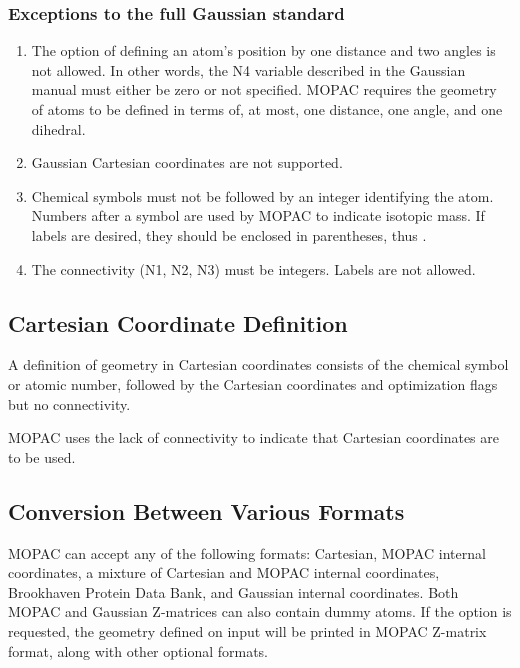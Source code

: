 \subsubsection{Exceptions to the full Gaussian standard}
\begin{enumerate}
\item  The option of defining an atom's position by  one  distance  and
       two  angles  is  not  allowed.   In other words, the N4 variable
       described in the Gaussian manual must  either  be  zero  or  not
       specified.   MOPAC  requires the geometry of atoms to be defined
       in terms of, at most, one distance, one angle, and one dihedral.

\item  Gaussian Cartesian coordinates are not supported.

\item Chemical symbols must not be followed by an integer  identifying
 the  atom.  Numbers after a symbol are used by MOPAC to indicate
 isotopic mass.  If labels are desired, they should  be  enclosed
 in parentheses, thus .

\item The connectivity (N1, N2, N3) must be integers.  Labels are  not
          allowed.
\end{enumerate}

\subsection{Cartesian Coordinate Definition}
 A definition of geometry in Cartesian coordinates  consists  of  the
   chemical  symbol  or atomic number, followed by the Cartesian coordinates
   and optimization flags but no connectivity.

   MOPAC uses the lack  of  connectivity  to  indicate  that  Cartesian
   coordinates  are  to  be used.



\subsection{Conversion Between Various Formats}
MOPAC can accept any of the  following  formats:   Cartesian,  MOPAC internal
coordinates, a mixture of Cartesian and MOPAC internal coordinates, Brookhaven
Protein Data Bank, and Gaussian  internal coordinates.  Both MOPAC and Gaussian
Z-matrices can also  contain  dummy  atoms.    If the  option is
requested, the geometry defined on input will be printed in MOPAC Z-matrix
format, along with other optional formats.


